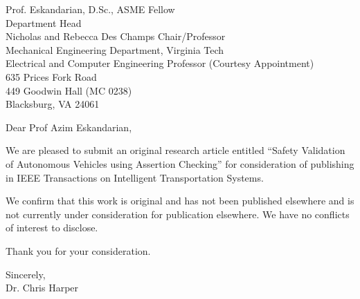 \documentclass[11pt, a4paper]{letter} %
\begin{document}

\begin{letter}{
	Prof. Eskandarian, D.Sc., ASME Fellow\\
	Department Head\\
	Nicholas and Rebecca Des Champs Chair/Professor \\
	Mechanical Engineering Department, Virginia Tech\\
	Electrical and Computer Engineering Professor (Courtesy Appointment)\\
	635 Prices Fork Road\\ 
	449 Goodwin Hall (MC 0238)\\
	Blacksburg, VA 24061\\
}


\opening{Dear Prof Azim Eskandarian,}

\noindent We are pleased to submit an original research article entitled “Safety Validation of Autonomous Vehicles using Assertion Checking” for consideration of publishing in IEEE Transactions on Intelligent Transportation Systems. 

\noindent We confirm that this work is original and has not been published elsewhere and is not currently under consideration for publication elsewhere. We have no conflicts of interest to disclose. 

\noindent Thank you for your consideration. 

\noindent Sincerely,\\


\noindent Dr. Chris Harper





\end{letter}
\end{document}
